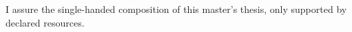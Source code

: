 
\clearemptydoublepage

\thispagestyle{empty}

\vspace*{0.8\textheight}
\noindent
I assure the single-handed composition of this master's thesis, only supported by declared resources.

\vspace{15mm}
\noindent
\theplace \quad \thedate \hspace{6cm} \theauthor

\newpage

